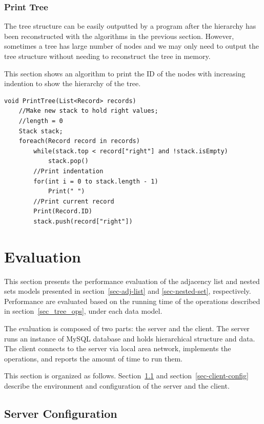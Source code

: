 \subsubsection{Print Tree}

The tree structure can be easily outputted by a program after the hierarchy has been reconstructed with the algorithms in the previous section. However, sometimes a tree has large number of nodes and we may only need to output the tree structure without needing to reconstruct the tree in memory.

This section shows an algorithm to print the ID of the nodes with increasing indention to show the hierarchy of the tree.

\begin{lstlisting}[caption={Tree reconstruction using Left and Right value},label=ns_print_tree]
void PrintTree(List<Record> records)
	//Make new stack to hold right values; 
	//length = 0
	Stack stack;
	foreach(Record record in records)
		while(stack.top < record["right"] and !stack.isEmpty)
			stack.pop()
		//Print indentation
		for(int i = 0 to stack.length - 1) 
			Print(" ")
		//Print current record
		Print(Record.ID)
		stack.push(record["right"])
\end{lstlisting}

\section{Evaluation}

This section presents the performance evaluation of the adjacency list and nested sets models presented in section~\ref{sec-adj-list} and \ref{sec-nested-set}, respectively. Performance are evaluated based on the running time of the operations described in section~\ref{sec_tree_ops}, under each data model.

The evaluation is composed of two parts: the server and the client. The server runs an instance of MySQL database and holds hierarchical structure and data. The client connects to the server via local area network, implements the operations, and reports the amount of time to run them.

This section is organized as follows. Section~\ref{sec-server-config} and section~\ref{sec-client-config} describe the environment and configuration of the server and the client.

\subsection{Server Configuration}\label{sec-server-config}

